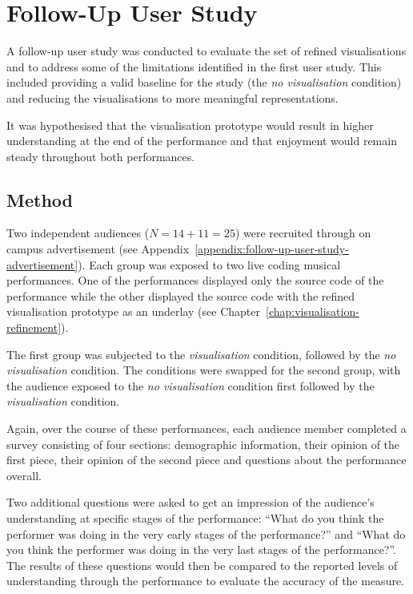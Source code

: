 
\chapter{Follow-Up User Study}
\label{chap:follow-up-user-study}

A follow-up user study was conducted to evaluate the set of refined visualisations and to address some of the limitations identified in the first user study. This included providing a valid baseline for the study (the \emph{no visualisation} condition) and reducing the visualisations to more meaningful representations.

It was hypothesised that the visualisation prototype would result in higher understanding at the end of the performance and that enjoyment would remain steady throughout both performances.

\section{Method}

Two independent audiences ($N=14+11=25$) were recruited through on campus advertisement (see Appendix~\ref{appendix:follow-up-user-study-advertisement}). Each group was exposed to two live coding musical performances. One of the performances displayed only the source code of the performance while the other displayed the source code with the refined visualisation prototype as an underlay (see Chapter~\ref{chap:visualisation-refinement}).

The first group was subjected to the \emph{visualisation} condition, followed by the \emph{no visualisation} condition. The conditions were swapped for the second group, with the audience exposed to the \emph{no visualisation} condition first followed by the \emph{visualisation} condition.

Again, over the course of these performances, each audience member completed a survey consisting of four sections: demographic information, their opinion of the first piece, their opinion of the second piece and questions about the performance overall. 

Two additional questions were asked to get an impression of the audience's understanding at specific stages of the performance: ``What do you think the performer was doing in the very early stages of the performance?'' and ``What do you think the performer was doing in the very last stages of the performance?''. The results of these questions would then be compared to the reported levels of understanding through the performance to evaluate the accuracy of the measure.

